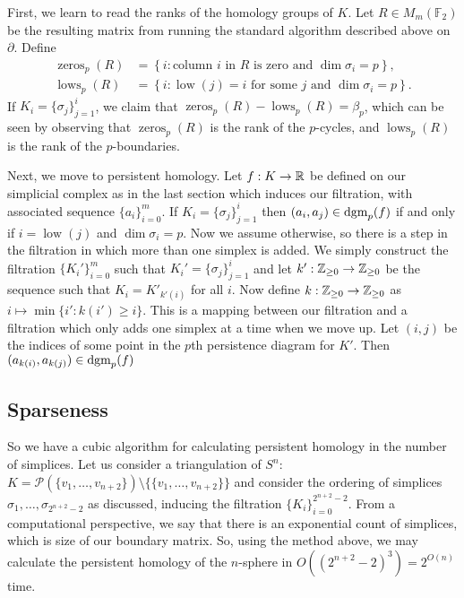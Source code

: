 First, we learn to read the ranks of the homology groups of $K$. Let $R \in M_m(\mathbb F_2)$ be the resulting matrix from running the standard algorithm described above on $\partial$. Define 
\begin{align*}
  \operatorname{zeros}_p(R) &= \left\{
    i: \text{column $i$ in $R$ is zero and $\dim\sigma_i=p$}
  \right\}, \\
  \operatorname{lows}_p(R) &= \left\{
    i: \text{$\operatorname{low}(j) = i$ for some $j$ and $\dim\sigma_i=p$}
  \right\}.
\end{align*}
If $K_i = \{\sigma_j\}_{j=1}^i$, we claim that $\operatorname{zeros}_p(R) - \operatorname{lows}_p(R) = \beta_p$, which can be seen by observing that $\operatorname{zeros}_p(R)$ is the rank of the $p$-cycles, and $\operatorname{lows}_p(R)$ is the rank of the $p$-boundaries. 

Next, we move to persistent homology. Let $f: K \to \mathbb{R}$ be defined on our simplicial complex as in the last section which induces our filtration, with associated sequence $\{a_i\}_{i=0}^m$. If $K_i = \{\sigma_j\}_{j=1}^i$ then $(a_i, a_j) \in \operatorname*{dgm}_p(f)$ if and only if $i = \operatorname{low}(j)$ and $\dim\sigma_i = p$. Now we assume otherwise, so there is a step in the filtration in which more than one simplex is added. We simply construct the filtration $\{K_i'\}_{i=0}^m$ such that $K_i' =  \{\sigma_j\}_{j=1}^i$ and let $k': \mathbb{Z}_{\geq 0} \to \mathbb{Z}_{\geq 0}$ be the sequence such that $K_i = K'_{k'(i)}$ for all $i$. Now define $k: \mathbb{Z}_{\geq 0} \to \mathbb{Z}_{\geq 0}$ as $i \mapsto \min\{i': k(i') \geq i \}$. This is a mapping between our filtration and a filtration which only adds one simplex at a time when we move up. Let $(i, j)$ be the indices of some point in the $p$th persistence diagram for $K'$. Then $(a_{k(i)}, a_{k(j)}) \in \operatorname*{dgm}_p(f)$

\subsection{Sparseness}

So we have a cubic algorithm for calculating persistent homology in the number of simplices. Let us consider a triangulation of $S^n$: $K = \mathcal P(\{v_1, \ldots, v_{n+2}\}) \setminus \{\{v_1, \ldots, v_{n+2}\}\}$ and consider the ordering of simplices $\sigma_1, \ldots, \sigma_{2^{n+2}-2}$ as discussed, inducing the filtration $\{K_i\}_{i=0}^{2^{n+2}-2}$. From a computational perspective, we say that there is an exponential count of simplices, which is size of our boundary matrix. So, using the method above, we may calculate the persistent homology of the $n$-sphere in $O((2^{n+2}-2)^3)=2^{O(n)}$ time.

